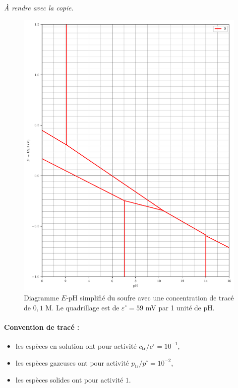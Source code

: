 \begin{nopagebreak}
     \textsl{\`A rendre avec la copie.}
    
    \begin{figure}[H]
        \centering
        \includegraphics[width = \linewidth]{chimiePC/gene/E-pH-S.pdf}
        \caption{Diagramme $E$-pH simplifié du soufre avec une concentration de tracé de $0,1$ M. \protect\linebreak
        Le quadrillage est de $\varepsilon^\circ = 59$ mV par 1 unité de pH.}
        \label{fig:EpHS}
    \end{figure}
    
    \paragraph{Convention de tracé :}
\begin{itemize}
    \item les espèces en solution ont pour activité $c_\text{tr}/c^\circ = 10^{-1}$,
    \item les espèces gazeuses ont pour activité $p_\text{tr}/p^\circ = 10^{-2}$,
    \item les espèces solides ont pour activité $1$.
\end{itemize}

\end{nopagebreak}

